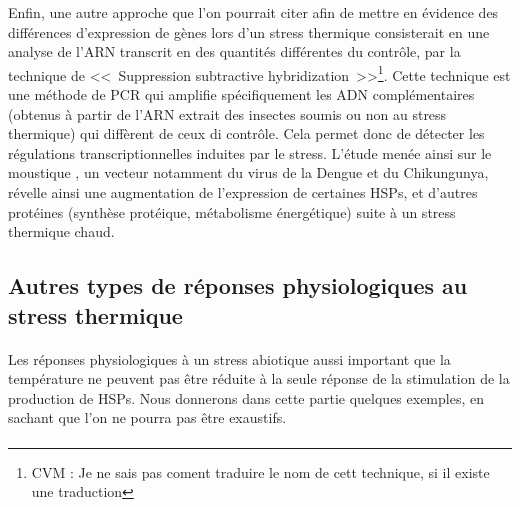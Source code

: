 
		Enfin, une autre approche que l'on pourrait citer afin de mettre en évidence des différences d'expression de gènes lors d'un stress thermique consisterait en une analyse de l'ARN transcrit en des quantités différentes du contrôle, par la technique de <<~Suppression subtractive hybridization~>>\footnote{CVM : Je ne sais pas coment traduire le nom de cett technique, si il existe une traduction}.
		Cette technique est une méthode de PCR qui amplifie spécifiquement les ADN complémentaires (obtenus à partir de l'ARN extrait des insectes soumis ou non au stress thermique) qui diffèrent de ceux di contrôle.
		Cela permet donc de détecter les régulations transcriptionnelles induites par le stress.
		L'étude menée ainsi sur le moustique , un vecteur notamment du virus de la Dengue et du Chikungunya, révelle ainsi une augmentation de l'expression de certaines HSPs, et d'autres protéines (synthèse protéique, métabolisme énergétique) suite à un stress thermique chaud.


		\subsection{Autres types de réponses physiologiques au stress thermique} %

		\paragraph{}
		Les réponses physiologiques à un stress abiotique aussi important que la température ne peuvent pas être réduite à la seule réponse de la stimulation de la production de HSPs.
		Nous donnerons dans cette partie quelques exemples, en sachant que l'on ne pourra pas être exaustifs.

		\paragraph{}



